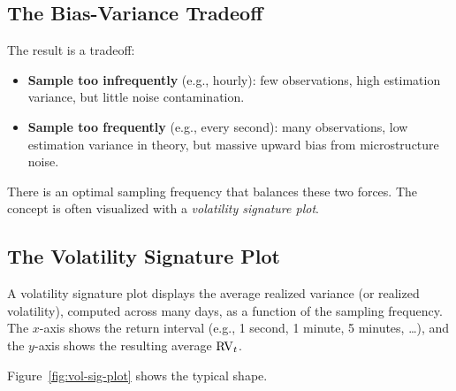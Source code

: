 \subsection{The Bias-Variance Tradeoff}

The result is a tradeoff:
\begin{itemize}[nosep]
  \item \textbf{Sample too infrequently} (e.g., hourly): few observations, high estimation variance, but little noise contamination.
  \item \textbf{Sample too frequently} (e.g., every second): many observations, low estimation variance in theory, but massive upward bias from microstructure noise.
\end{itemize}

There is an optimal sampling frequency that balances these two forces.
The concept is often visualized with a \emph{volatility signature plot}.

\subsection{The Volatility Signature Plot}

\begin{definition}
A volatility signature plot displays the average realized variance (or realized volatility), computed across many days, as a function of the sampling frequency.
The $x$-axis shows the return interval (e.g., 1 second, 1 minute, 5 minutes, \ldots), and the $y$-axis shows the resulting average $\operatorname{RV}_t$.
\end{definition}

Figure~\ref{fig:vol-sig-plot} shows the typical shape.

